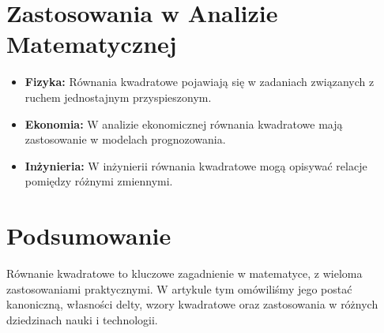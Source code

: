 \documentclass[12pt]{article}
\begin{document}
\section{Zastosowania w Analizie Matematycznej}
\begin{itemize}
  \item \textbf{Fizyka:} Równania kwadratowe pojawiają się w zadaniach związanych z ruchem jednostajnym przyspieszonym.
  
  \item \textbf{Ekonomia:} W analizie ekonomicznej równania kwadratowe mają zastosowanie w modelach prognozowania.
  
  \item \textbf{Inżynieria:} W inżynierii równania kwadratowe mogą opisywać relacje pomiędzy różnymi zmiennymi.
\end{itemize}

\section{Podsumowanie}
Równanie kwadratowe to kluczowe zagadnienie w matematyce, z wieloma zastosowaniami praktycznymi. W artykule tym omówiliśmy jego postać kanoniczną, własności delty, wzory kwadratowe oraz zastosowania w różnych dziedzinach nauki i technologii.
\end{document}
